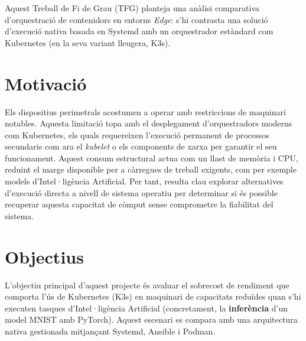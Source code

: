 %


Aquest Treball de Fi de Grau (TFG) planteja una anàlisi comparativa d'orquestració de contenidors en entorns \textit{Edge}: s'hi contrasta una solució d'execució nativa basada en Systemd amb un orquestrador estàndard com Kubernetes (en la seva variant lleugera, K3s).

\section{Motivació}
Els dispositius perimetrals acostumen a operar amb restriccions de maquinari notables. Aquesta limitació topa amb el desplegament d'orquestradors moderns com Kubernetes, els quals requereixen l'execució permanent de processos secundaris \textemdash{}com ara el \textit{kubelet} o els components de xarxa\textemdash{} per garantir el seu funcionament. Aquest consum estructural actua com un llast de memòria i CPU, reduint el marge disponible per a càrregues de treball exigents, com per exemple models d'Intel·ligència Artificial. Per tant, resulta clau explorar alternatives d'execució directa a nivell de sistema operatiu per determinar si és possible recuperar aquesta capacitat de còmput sense comprometre la fiabilitat del sistema.

\section{Objectius}
L'objectiu principal d'aquest projecte és avaluar el sobrecost de rendiment que comporta l'ús de Kubernetes (K3s) en maquinari de capacitats reduïdes quan s'hi executen tasques d'Intel·ligència Artificial (concretament, la \textbf{inferència} d'un model MNIST amb PyTorch). Aquest escenari es compara amb una arquitectura nativa gestionada mitjançant Systemd, Ansible i Podman.

